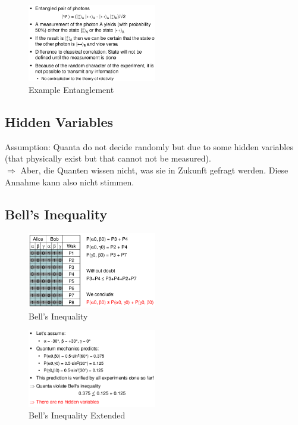 \begin{figure}[H]
\centering
\includegraphics[width=0.5\textwidth]{figures/exampleEntanglement.png}
\caption{Example Entanglement}
\end{figure}

\hypertarget{hidden-variables}{%
\subsection{Hidden Variables}\label{hidden-variables}}

Assumption: Quanta do not decide randomly but due to some hidden
variables (that physically exist but that cannot not be measured).\\
$\Rightarrow$ Aber, die Quanten wissen nicht, was sie in Zukunft
gefragt werden. Diese Annahme kann also nicht stimmen.

\hypertarget{bells-inequality}{%
\subsection{Bell's Inequality}\label{bells-inequality}}

\begin{figure}[H]
\centering
\includegraphics[width=0.5\textwidth]{figures/bellsInequality.png}
\caption{Bell's Inequality}
\end{figure}

\begin{figure}[H]
\centering
\includegraphics[width=0.5\textwidth]{figures/bellsInequality2.png}
\caption{Bell's Inequality Extended}
\end{figure}

